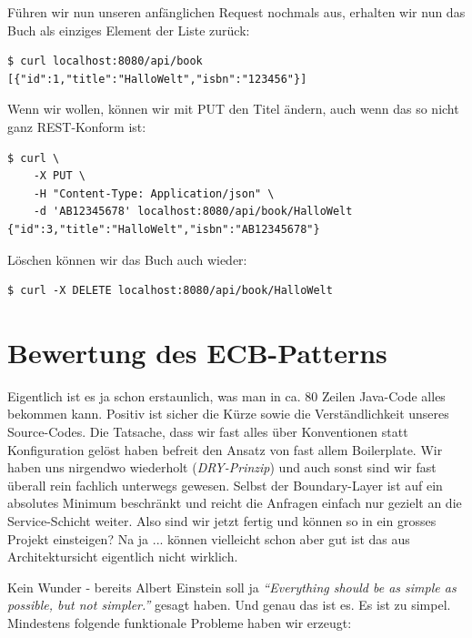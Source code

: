 Führen wir nun unseren anfänglichen Request nochmals aus, erhalten wir nun
das Buch als einziges Element der Liste zurück:

\begin{terminalbox}
    \begin{verbatim}
$ curl localhost:8080/api/book
[{"id":1,"title":"HalloWelt","isbn":"123456"}]
    \end{verbatim}
\end{terminalbox}

Wenn wir wollen, können wir mit PUT den Titel ändern, auch
wenn das so nicht ganz REST-Konform ist:

\begin{terminalbox}
    \begin{verbatim}
$ curl \
    -X PUT \
    -H "Content-Type: Application/json" \
    -d 'AB12345678' localhost:8080/api/book/HalloWelt
{"id":3,"title":"HalloWelt","isbn":"AB12345678"}
    \end{verbatim}
\end{terminalbox}

Löschen können wir das Buch auch wieder:

\begin{terminalbox}
    \begin{verbatim}
$ curl -X DELETE localhost:8080/api/book/HalloWelt
    \end{verbatim}
\end{terminalbox}

\section{Bewertung des ECB-Patterns}
Eigentlich ist es ja schon erstaunlich, was man in ca. 80 Zeilen Java-Code
alles bekommen kann. Positiv ist sicher die Kürze sowie die Verständlichkeit
unseres Source-Codes. Die Tatsache, dass wir fast alles über Konventionen
statt Konfiguration gelöst haben befreit den Ansatz von fast allem
Boilerplate. Wir haben uns nirgendwo wiederholt (\textit{DRY-Prinzip}) und auch
sonst sind wir fast überall rein fachlich unterwegs gewesen. Selbst der
Boundary-Layer ist auf ein absolutes Minimum beschränkt und reicht die Anfragen
einfach nur gezielt an die Service-Schicht weiter. Also sind wir jetzt fertig
und können so in ein grosses Projekt einsteigen? Na ja ... können vielleicht
schon aber gut ist das aus Architektursicht eigentlich nicht wirklich.

Kein Wunder - bereits Albert Einstein soll ja \textit{``Everything should be 
as simple as possible, but not simpler.''} gesagt haben. Und genau das ist es. 
Es ist zu simpel. Mindestens folgende funktionale Probleme haben wir
erzeugt:

